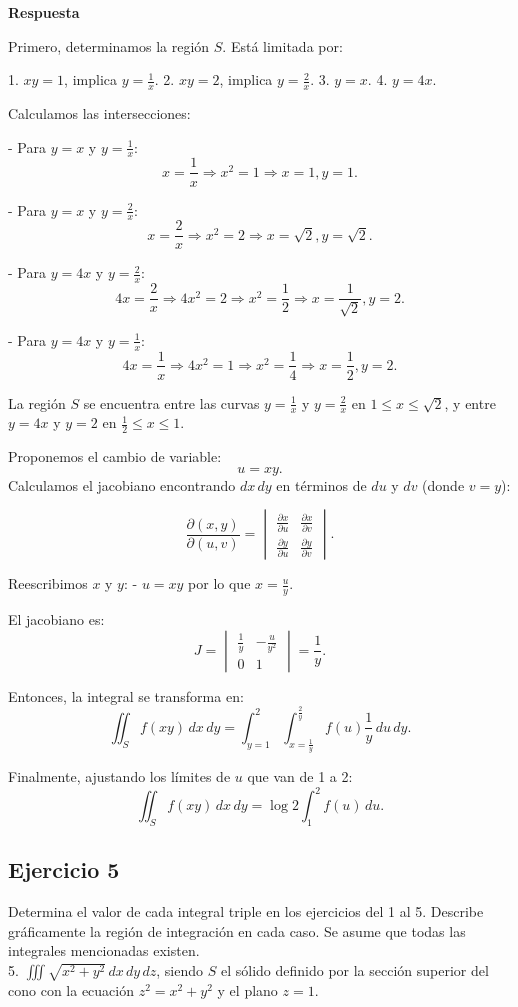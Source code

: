 \documentclass{report}
\begin{document}
\textbf{Respuesta}

Primero, determinamos la región \( S \). Está limitada por:

1. \( xy = 1 \), implica \( y = \frac{1}{x} \).
2. \( xy = 2 \), implica \( y = \frac{2}{x} \).
3. \( y = x \).
4. \( y = 4x \).

Calculamos las intersecciones:

- Para \( y = x \) y \( y = \frac{1}{x} \):
  \[
  x = \frac{1}{x} \Rightarrow x^2 = 1 \Rightarrow x = 1, y = 1.
  \]

- Para \( y = x \) y \( y = \frac{2}{x} \):
  \[
  x = \frac{2}{x} \Rightarrow x^2 = 2 \Rightarrow x = \sqrt{2}, y = \sqrt{2}.
  \]

- Para \( y = 4x \) y \( y = \frac{2}{x} \):
  \[
  4x = \frac{2}{x} \Rightarrow 4x^2 = 2 \Rightarrow x^2 = \frac{1}{2} \Rightarrow x = \frac{1}{\sqrt{2}}, y = 2.
  \]

- Para \( y = 4x \) y \( y = \frac{1}{x} \):
  \[
  4x = \frac{1}{x} \Rightarrow 4x^2 = 1 \Rightarrow x^2 = \frac{1}{4} \Rightarrow x = \frac{1}{2}, y = 2.
  \]

La región \( S \) se encuentra entre las curvas \( y = \frac{1}{x} \) y \( y = \frac{2}{x} \) en \( 1 \leq x \leq \sqrt{2} \), y entre \( y = 4x \) y \( y = 2 \) en \( \frac{1}{2} \leq x \leq 1 \).

Proponemos el cambio de variable:
\[
u = xy.
\]
Calculamos el jacobiano encontrando \( dx \, dy \) en términos de \( du \) y \( dv \) (donde \( v = y \)):

\[
\frac{\partial (x, y)}{\partial (u, v)} = \begin{vmatrix}
\frac{\partial x}{\partial u} & \frac{\partial x}{\partial v} \\
\frac{\partial y}{\partial u} & \frac{\partial y}{\partial v}
\end{vmatrix}.
\]

Reescribimos \( x \) y \( y\):
- \( u = xy \) por lo que \( x = \frac{u}{y} \).

El jacobiano es:
\[
J = \begin{vmatrix}
\frac{1}{y} & -\frac{u}{y^2} \\
0 & 1
\end{vmatrix} = \frac{1}{y}.
\]

Entonces, la integral se transforma en:
\[
\iint_{S} f(x y) \, dx \, dy = \int_{y=1}^{2} \int_{x=\frac{1}{y}}^{\frac{2}{y}} f(u) \frac{1}{y} \, du \, dy.
\]

Finalmente, ajustando los límites de \( u \) que van de 1 a 2:
\[
\iint_{S} f(x y) \, dx \, dy = \log 2 \int_{1}^{2} f(u) \, du.
\]\subsection{Ejercicio 5}
Determina el valor de cada integral triple en los ejercicios del 1 al 5. Describe gráficamente la región de integración en cada caso. Se asume que todas las integrales mencionadas existen.\\
5. $\iiint \sqrt{  x^{2}+y^{2}} \,dx \,dy \,dz$, siendo $S$ el sólido definido por la sección superior del cono con la ecuación $z^{2}=x^{2}+y^{2}$ y el plano $z=1$.
\end{document}
